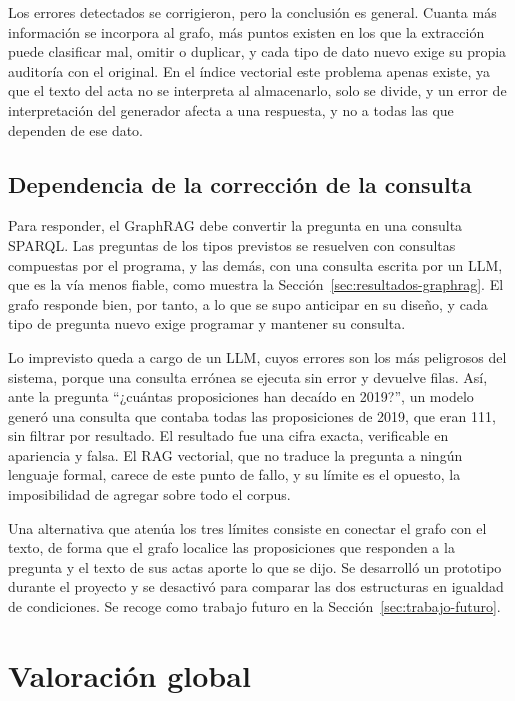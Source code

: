 \documentclass[11pt, a4paper]{report}
\begin{document}
	Los errores detectados se corrigieron, pero la conclusión es general. Cuanta
	más información se incorpora al grafo, más puntos existen en los que la
	extracción puede clasificar mal, omitir o duplicar, y cada tipo de dato nuevo
	exige su propia auditoría con el original. En el índice vectorial este
	problema apenas existe, ya que el texto del acta no se interpreta al almacenarlo,
	solo se divide, y un error de interpretación del generador afecta a una
	respuesta, y no a todas las que dependen de ese dato.

	\subsection{Dependencia de la corrección de la consulta}

	Para responder, el GraphRAG debe convertir la pregunta en una consulta SPARQL.
	Las preguntas de los tipos previstos se resuelven con consultas compuestas por
	el programa, y las demás, con una consulta escrita por un LLM, que es la vía
	menos fiable, como muestra la Sección~\ref{sec:resultados-graphrag}. El grafo
	responde bien, por tanto, a lo que se supo anticipar en su diseño, y cada tipo
	de pregunta nuevo exige programar y mantener su consulta.

	Lo imprevisto queda a cargo de un LLM, cuyos errores son los más peligrosos
	del sistema, porque una consulta errónea se ejecuta sin error y devuelve
	filas. Así, ante la pregunta ``¿cuántas proposiciones han decaído en 2019?'',
	un modelo generó una consulta que contaba todas las proposiciones de 2019, que
	eran 111, sin filtrar por resultado. El resultado fue una cifra exacta,
	verificable en apariencia y falsa. El RAG vectorial, que no traduce la pregunta a ningún
	lenguaje formal, carece de este punto de fallo, y su límite es el opuesto, la
	imposibilidad de agregar sobre todo el corpus.

	Una alternativa que atenúa los tres límites consiste en conectar el grafo con
	el texto, de forma que el grafo localice las proposiciones que responden a la
	pregunta y el texto de sus actas aporte lo que se dijo. Se desarrolló un
	prototipo durante el proyecto y se desactivó para comparar las dos estructuras
	en igualdad de condiciones. Se recoge como trabajo futuro en la
	Sección~\ref{sec:trabajo-futuro}.

	\section{Valoración global}
\end{document}

